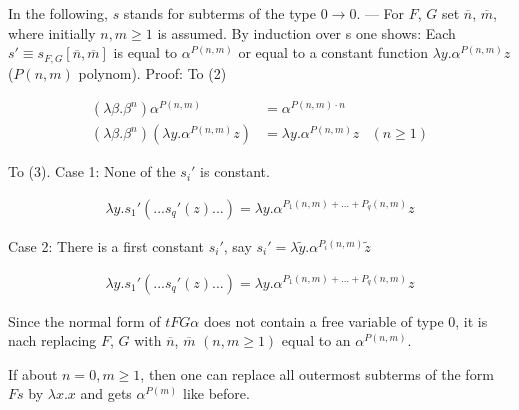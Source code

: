 \documentclass[11pt]{article}
\newcommand{\ga}{\alpha}
\newcommand{\gb}{\beta}
\newcommand{\gl}{\lambda}
\begin{document}
In the following, \(s\) stands for subterms of the type \(0 \rightarrow 0\). — For $F$, $G$ set $\overline{n}$, $\overline{m}$, where initially \(n, m \geq 1\) is assumed. By induction over s one shows: Each \(s' \equiv s_{F, G} [\overline{n}, \overline{m}]\) is equal to \(\alpha^{P(n, m)}\) or equal to a constant function \(\gl y. \alpha^{P(n, m)} z\) (\(P(n, m)\) polynom). Proof: To (2)

\begin{align*} 
    (\gl \gb. \gb^n) \ga^{P(n, m)} &= \ga^{P(n, m) \cdot n}\\ 
    (\gl \gb. \gb^n) (\gl y. \ga^{P(n, m) } z) &= \gl y. \ga^{P(n, m)} z  & (n \geq 1)
\end{align*}

To (3). Case 1: None of the \(s_i'\) is constant.

\begin{align*}
    \gl y. s_1' (...s_q'(z)...) = \gl y. \ga^{P_1(n, m) + \dots + P_q(n, m)} z
\end{align*}

Case 2: There is a first constant \(s_i'\), say \(s_i' = \gl \tilde{y}. \ga^{P_i(n, m)} \tilde{z}\)

\begin{align*}
    \gl y. s_1' (...s_q'(z)...) = \gl y. \ga^{P_1(n, m) + \dots + P_q(n, m)} z
\end{align*}

Since the normal form of \(t F G \ga\) does not contain a free variable of type $0$, it is nach replacing $F$, $G$ with \(\overline{n}\), \(\overline{m}\) $(n,m \geq 1)$ equal to an \(\ga^{P(n, m)}\).

If about \(n = 0, m \geq 1\), then one can replace all outermost subterms of the form \(F s\) by \(\gl x. x\) and gets \(\ga^{P(m)}\) like before.
\end{document}
